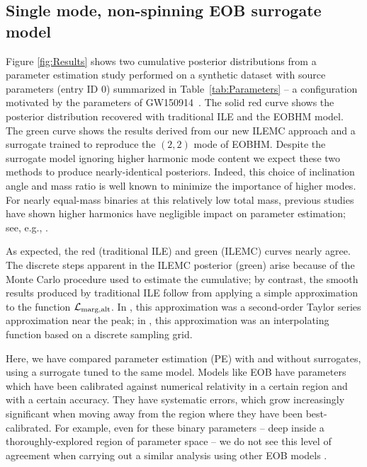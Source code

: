 \documentclass[aps,prd,nofootinbib,showpacs,amssymb,twocolumn]{revtex4}
\begin{document}
\subsection{Single mode, non-spinning EOB surrogate model}

Figure \ref{fig:Results} shows two cumulative posterior distributions from a parameter estimation study performed on a synthetic dataset 
with source parameters (entry ID 0) summarized in Table~\ref{tab:Parameters}
%
%
%
-- a configuration motivated by the parameters of GW150914~\cite{DiscoveryPaper}. 
The solid red curve shows the posterior
distribution 
%
recovered with traditional ILE and the EOBHM model.  The 
%
green curve shows the results derived from our new 
%
ILEMC approach
%
and a surrogate  trained to reproduce the $(2,2)$ mode of EOBHM. 
Despite the surrogate model ignoring higher harmonic mode content 
we expect these two methods to produce nearly-identical posteriors. Indeed,
this choice of
inclination angle and mass ratio is well known to minimize 
the 
%
importance of higher modes. For nearly equal-mass binaries
at this relatively low total mass, previous studies have shown 
higher harmonics have 
%
negligible impact on parameter estimation; see, e.g.,
\cite{2015PhRvD..92b2002G,NRPaper,LIGO-O1-PENR-Systematics,gwastro-mergers-nr-LangeMastersThesis}.

As expected, the 
red (traditional ILE) and green (ILEMC) curves
nearly agree.   
The discrete steps apparent in the ILEMC posterior (green) arise because  of the Monte Carlo  procedure used to estimate the
cumulative; by contrast, the smooth results produced by traditional ILE follow  from 
%
applying a simple approximation to the function ${\cal L}_{\rm marg,alt}$.  
In \cite{NRPaper}, this approximation was a second-order Taylor series approximation near the peak; in
  \cite{gwastro-PE-AlternativeArchitectures}, this approximation was an interpolating function based on a discrete
  sampling grid.
%
%

Here, we have compared parameter estimation (PE) with and without surrogates, using a surrogate tuned to the same model.
Models like EOB have parameters which have been calibrated against numerical relativity in a certain region
  and with a certain accuracy. They have systematic errors, which grow increasingly significant when moving away from the
region where they have been best-calibrated.  For example, even for these binary parameters -- deep inside a
thoroughly-explored region of parameter space --  we do not see this level of agreement when carrying out a similar analysis
using other EOB models \cite{gw-astro-EOBspin-Tarrachini2012}.
%
%
%
%
\end{document}
